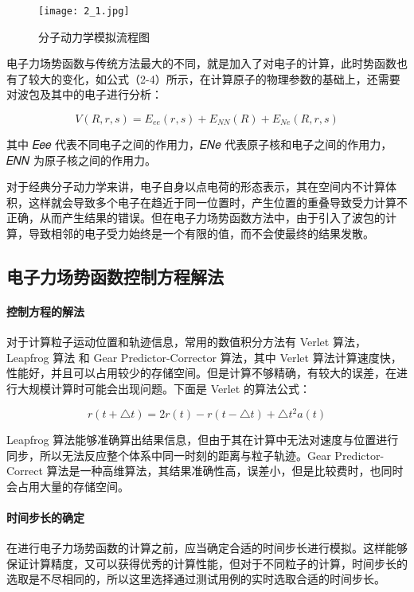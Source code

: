  \begin{figure}[h]
  \centering
  \texttt{[image: 2\_1.jpg]}
  \caption{分子动力学模拟流程图}
\end{figure}

 电子力场势函数与传统方法最大的不同，就是加入了对电子的计算，此时势函数也有了较大的变化，如公式（2-4）所示，在计算原子的物理参数的基础上，还需要对波包及其中的电子进行分析：

 \begin{equation}
   V(R,r,s)=E_{ee}(r,s)+E_{NN}(R)+E_{Ne}(R,r,s)
\end{equation}

其中 𝐸𝑒𝑒 代表不同电子之间的作用力，𝐸𝑁𝑒 代表原子核和电子之间的作用力，𝐸𝑁𝑁 为原子核之间的作用力。

对于经典分子动力学来讲，电子自身以点电荷的形态表示，其在空间内不计算体积，这样就会导致多个电子在趋近于同一位置时，产生位置的重叠导致受力计算不正确，从而产生结果的错误。但在电子力场势函数方法中，由于引入了波包的计算，导致相邻的电子受力始终是一个有限的值，而不会使最终的结果发散。


\subsection{电子力场势函数控制方程解法}
\paragraph{控制方程的解法}
对于计算粒子运动位置和轨迹信息，常用的数值积分方法有 Verlet 算法， Leapfrog 算法\cite{hut1995building} 和 Gear Predictor-Corrector 算法\cite{gear1967numerical}，其中 Verlet 算法计算速度快，性能好，并且可以占用较少的存储空间。但是计算不够精确，有较大的误差，在进行大规模计算时可能会出现问题。下面是 Verlet 的算法公式：

\begin{equation}
  r(t+\triangle t)=2r(t)-r(t-\triangle t)+\triangle t^2a(t)
  \end{equation}

Leapfrog 算法能够准确算出结果信息，但由于其在计算中无法对速度与位置进行同步，所以无法反应整个体系中同一时刻的距离与粒子轨迹。Gear Predictor-Correct 算法是一种高维算法，其结果准确性高，误差小，但是比较费时，也同时会占用大量的存储空间。

\paragraph{时间步长的确定}
在进行电子力场势函数的计算之前，应当确定合适的时间步长进行模拟。这样能够保证计算精度，又可以获得优秀的计算性能，但对于不同粒子的计算，时间步长的选取是不尽相同的，所以这里选择通过测试用例的实时选取合适的时间步长。

